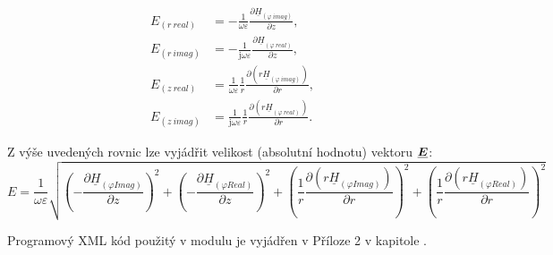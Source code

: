 \documentclass[12pt,a4paper,oneside]{article}
\numberwithin{equation}{section} %
\numberwithin{figure}{section} %
\numberwithin{table}{section} %
\newcommand{\mj}{\mathrm{j}} %
\renewcommand{\vec}[1]{\mbox{\boldmath$#1$}} %
\newcommand{\faz}[1]{{\underline{#1}}} %
\begin{document}
\begin{subequations}
\begin{align}
E _{(r~real)} &= - \frac{1}{\omega \varepsilon} \frac{\partial \faz{H} _{(\varphi ~ imag)}}{\partial z} ,
\\
E _{(r~imag)} &= - \frac{1}{\mj \omega \varepsilon} \frac{\partial \faz{H} _{(\varphi ~ real)}}{\partial z} ,
\\
E _{(z~real)} &= \frac{1}{\omega \varepsilon} \frac{1}{r} \frac{\partial (r \faz{H} _{(\varphi ~ imag)})}{\partial r} ,
\\
E _{(z~imag)} &= \frac{1}{\mj \omega \varepsilon} \frac{1}{r} \frac{\partial (r \faz{H} _{(\varphi ~ real)})}{\partial r} .
\end{align}
\end{subequations}

Z výše uvedených rovnic lze vyjádřit velikost (absolutní hodnotu) vektoru $\faz{\vec{E}}$:
\begin{equation}
E = \frac{1}{\omega \varepsilon} \sqrt{\left( - \frac{\partial \faz{H} _{(\varphi Imag)}}{\partial z} \right) ^2 + \left( - \frac{\partial \faz{H} _{(\varphi Real)}}{\partial z} \right) ^2 + \left( \frac{1}{r} \frac{\partial (r \faz{H} _{(\varphi Imag)})}{\partial r} \right) ^2 + \left( \frac{1}{r} \frac{\partial (r \faz{H} _{(\varphi Real)})}{\partial r} \right) ^2}
\end{equation}

Programový XML kód použitý v modulu je vyjádřen v Příloze 2 v kapitole .
\end{document}
